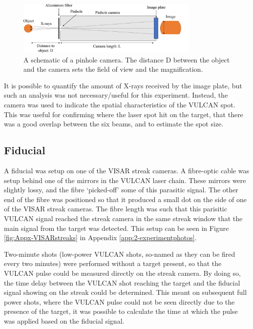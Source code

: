 \begin{figure}
\centering
\includegraphics[width=0.8\textwidth]{figures/Experiment/PinholeTest.pdf}%
\caption{\label{fig:Pinhole schematic} A schematic of a pinhole camera. The distance D between the object and the camera sets the field of view and the magnification.  }
\end{figure}

It is possible to quantify the amount of X-rays received by the image plate, but such an analysis was not necessary/useful for this experiment. Instead, the camera was used to indicate the spatial characteristics of the VULCAN spot. This was useful for confirming where the laser spot hit on the target, that there was a good overlap between the six beams, and to estimate the spot size.

\subsection{Fiducial} \label{Fidu theory}
A fiducial was setup on one of the VISAR streak cameras. A fibre-optic cable was setup behind one of the mirrors in the VULCAN laser chain. These mirrors were slightly lossy, and the fibre `picked-off' some of this parasitic signal. The other end of the fibre was positioned so that it produced a small dot on the side of one of the VISAR streak cameras. The fibre length was such that this parisitic VULCAN signal reached the streak camera in the same streak window that the main signal from the target was detected. This setup can be seen in Figure \ref{fig:Appx-VISARstreaks} in Appendix \ref{app:2-experimentphotos}.

Two-minute shots (low-power VULCAN shots, so-named as they can be fired every two minutes) were performed without a target present, so that the VULCAN pulse could be measured directly on the streak camera. By doing so, the time delay between the VULCAN shot reaching the target and the fiducial signal showing on the streak could be determined. This meant on subsequent full power shots, where the VULCAN pulse could not be seen directly due to the presence of the target, it was possible to calculate the time at which the pulse was applied based on the fiducial signal.

